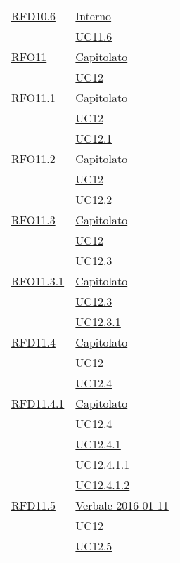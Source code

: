 \begin{longtable}{|>{\centering}m{5cm}|m{5cm}<{\centering}|}
\hyperlink{RFD10.6}{RFD10.6} & \hyperlink{Interno}{Interno}\\
& \hyperref[UC11.6]{UC11.6}\\ \hline

\hyperlink{RFO11}{RFO11} & \hyperlink{Capitolato}{Capitolato}\\
& \hyperref[UC12]{UC12}\\ \hline

\hyperlink{RFO11.1}{RFO11.1} & \hyperlink{Capitolato}{Capitolato}\\
& \hyperref[UC12]{UC12}\\
& \hyperref[UC12.1]{UC12.1}\\ \hline

\hyperlink{RFO11.2}{RFO11.2} & \hyperlink{Capitolato}{Capitolato}\\
& \hyperref[UC12]{UC12}\\
& \hyperref[UC12.2]{UC12.2}\\ \hline

\hyperlink{RFO11.3}{RFO11.3} & \hyperlink{Capitolato}{Capitolato}\\
& \hyperref[UC12]{UC12}\\
& \hyperref[UC12.3]{UC12.3}\\ \hline

\hyperlink{RFO11.3.1}{RFO11.3.1} & \hyperlink{Capitolato}{Capitolato}\\
& \hyperref[UC12.3]{UC12.3}\\
& \hyperref[UC12.3.1]{UC12.3.1}\\ \hline

\hyperlink{RFD11.4}{RFD11.4} & \hyperlink{Capitolato}{Capitolato}\\
& \hyperref[UC12]{UC12}\\
& \hyperref[UC12.4]{UC12.4}\\ \hline

\hyperlink{RFD11.4.1}{RFD11.4.1} & \hyperlink{Capitolato}{Capitolato}\\
& \hyperref[UC12.4]{UC12.4}\\
& \hyperref[UC12.4.1]{UC12.4.1}\\
& \hyperref[UC12.4.1.1]{UC12.4.1.1}\\
& \hyperref[UC12.4.1.2]{UC12.4.1.2}\\ \hline

\hyperlink{RFD11.5}{RFD11.5} & \hyperlink{Verbale 2016-01-11}{Verbale 2016-01-11}\\
& \hyperref[UC12]{UC12}\\
& \hyperref[UC12.5]{UC12.5}\\ \hline


\end{longtable}

